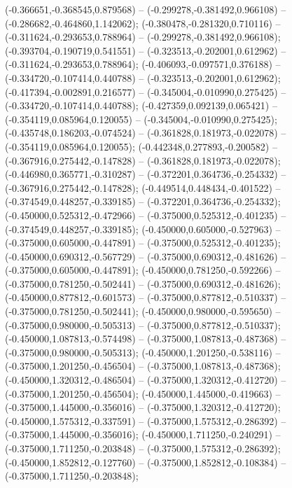  (-0.366651,-0.368545,0.879568) -- (-0.299278,-0.381492,0.966108) -- (-0.286682,-0.464860,1.142062);
 (-0.380478,-0.281320,0.710116) -- (-0.311624,-0.293653,0.788964) -- (-0.299278,-0.381492,0.966108);
 (-0.393704,-0.190719,0.541551) -- (-0.323513,-0.202001,0.612962) -- (-0.311624,-0.293653,0.788964);
 (-0.406093,-0.097571,0.376188) -- (-0.334720,-0.107414,0.440788) -- (-0.323513,-0.202001,0.612962);
 (-0.417394,-0.002891,0.216577) -- (-0.345004,-0.010990,0.275425) -- (-0.334720,-0.107414,0.440788);
 (-0.427359,0.092139,0.065421) -- (-0.354119,0.085964,0.120055) -- (-0.345004,-0.010990,0.275425);
 (-0.435748,0.186203,-0.074524) -- (-0.361828,0.181973,-0.022078) -- (-0.354119,0.085964,0.120055);
 (-0.442348,0.277893,-0.200582) -- (-0.367916,0.275442,-0.147828) -- (-0.361828,0.181973,-0.022078);
 (-0.446980,0.365771,-0.310287) -- (-0.372201,0.364736,-0.254332) -- (-0.367916,0.275442,-0.147828);
 (-0.449514,0.448434,-0.401522) -- (-0.374549,0.448257,-0.339185) -- (-0.372201,0.364736,-0.254332);
 (-0.450000,0.525312,-0.472966) -- (-0.375000,0.525312,-0.401235) -- (-0.374549,0.448257,-0.339185);
 (-0.450000,0.605000,-0.527963) -- (-0.375000,0.605000,-0.447891) -- (-0.375000,0.525312,-0.401235);
 (-0.450000,0.690312,-0.567729) -- (-0.375000,0.690312,-0.481626) -- (-0.375000,0.605000,-0.447891);
 (-0.450000,0.781250,-0.592266) -- (-0.375000,0.781250,-0.502441) -- (-0.375000,0.690312,-0.481626);
 (-0.450000,0.877812,-0.601573) -- (-0.375000,0.877812,-0.510337) -- (-0.375000,0.781250,-0.502441);
 (-0.450000,0.980000,-0.595650) -- (-0.375000,0.980000,-0.505313) -- (-0.375000,0.877812,-0.510337);
 (-0.450000,1.087813,-0.574498) -- (-0.375000,1.087813,-0.487368) -- (-0.375000,0.980000,-0.505313);
 (-0.450000,1.201250,-0.538116) -- (-0.375000,1.201250,-0.456504) -- (-0.375000,1.087813,-0.487368);
 (-0.450000,1.320312,-0.486504) -- (-0.375000,1.320312,-0.412720) -- (-0.375000,1.201250,-0.456504);
 (-0.450000,1.445000,-0.419663) -- (-0.375000,1.445000,-0.356016) -- (-0.375000,1.320312,-0.412720);
 (-0.450000,1.575312,-0.337591) -- (-0.375000,1.575312,-0.286392) -- (-0.375000,1.445000,-0.356016);
 (-0.450000,1.711250,-0.240291) -- (-0.375000,1.711250,-0.203848) -- (-0.375000,1.575312,-0.286392);
 (-0.450000,1.852812,-0.127760) -- (-0.375000,1.852812,-0.108384) -- (-0.375000,1.711250,-0.203848);
